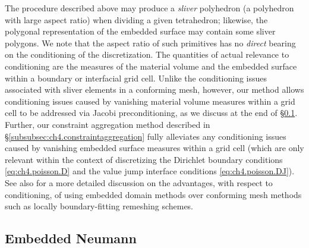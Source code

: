 The procedure described above may produce a \emph{sliver} polyhedron (a polyhedron with large aspect ratio) when dividing a given tetrahedron; likewise, the polygonal representation of the embedded surface may contain some sliver polygons. We note that the aspect ratio of such primitives has no \emph{direct} bearing on the conditioning of the discretization. The quantities of actual relevance to conditioning are the measures of the material volume and the embedded surface within a boundary or interfacial grid cell. Unlike the conditioning issues associated with sliver elements in a conforming mesh, however, our method allows conditioning issues caused by vanishing material volume measures within a grid cell to be addressed via Jacobi preconditioning, as we discuss at the end of \S\ref{subsec:ch4.discretization.neumann}. Further, our constraint aggregation method described in \S\ref{subsubsec:ch4.constraintaggregation} fully alleviates any conditioning issues caused by vanishing embedded surface measures within a grid cell (which are only relevant within the context of discretizing the Dirichlet boundary conditions \eqref{eq:ch4.poisson.D} and the value jump interface conditions \eqref{eq:ch4.poisson.DJ}). See also \cite{Lew.Adrian08} for a more detailed discussion on the advantages, with respect to conditioning, of using embedded domain methods over conforming mesh methods such as locally boundary-fitting remeshing schemes.

\subsection{Embedded Neumann} \label{subsec:ch4.discretization.neumann}

